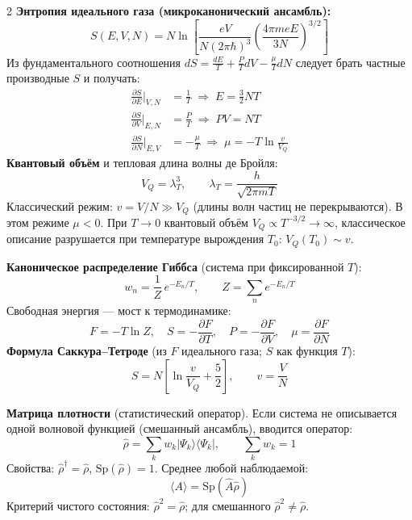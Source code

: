 \documentclass[a4paper,10pt]{article}
\begin{document}
\begin{multicols}{2}
\textbf{Энтропия идеального газа (микроканонический ансамбль):}
\begin{equation*}
    S(E,V,N) = N\ln\!\left[\frac{eV}{N(2\pi\hbar)^3}\!\left(\frac{4\pi meE}{3N}\right)^{\!3/2}\right]
\end{equation*}
Из фундаментального соотношения $dS = \frac{dE}{T} + \frac{P}{T}dV - \frac{\mu}{T}dN$ следует брать частные производные $S$ и получать:
\begin{align*}
    \frac{\partial S}{\partial E}\bigg|_{V,N} &= \frac{1}{T} \;\Rightarrow\; E = \tfrac{3}{2}NT \\[2pt]
    \frac{\partial S}{\partial V}\bigg|_{E,N} &= \frac{P}{T} \;\Rightarrow\; PV = NT \\[2pt]
    \frac{\partial S}{\partial N}\bigg|_{E,V} &= -\frac{\mu}{T} \;\Rightarrow\; \mu = -T\ln\frac{v}{V_Q}
\end{align*}
\textbf{Квантовый объём} и тепловая длина волны де Бройля:
\begin{equation*}
    V_Q = \lambda_T^3, \qquad \lambda_T = \frac{h}{\sqrt{2\pi mT}}
\end{equation*}
Классический режим: $v = V/N \gg V_Q$ (длины волн частиц не перекрываются). В этом режиме $\mu < 0$. При $T \to 0$ квантовый объём $V_Q \propto T^{-3/2} \to \infty$, классическое описание разрушается при температуре вырождения $T_0$: $V_Q(T_0) \sim v$.

\textbf{Каноническое распределение Гиббса} (система при фиксированной $T$):
\begin{equation*}
    w_n = \frac{1}{Z}\,e^{-E_n/T}, \qquad Z = \sum_n e^{-E_n/T}
\end{equation*}
Свободная энергия --- мост к термодинамике:
\begin{equation*}
    F = -T\ln Z, \quad S = -\frac{\partial F}{\partial T},\quad P = -\frac{\partial F}{\partial V},\quad \mu = \frac{\partial F}{\partial N}
\end{equation*}
\textbf{Формула Саккура--Тетроде} (из $F$ идеального газа; $S$ как функция $T$):
\begin{equation*}
    S = N\!\left[\ln\frac{v}{V_Q} + \frac{5}{2}\right], \qquad v = \frac{V}{N}
\end{equation*}

\textbf{Матрица плотности} (статистический оператор). Если система не описывается одной волновой функцией (смешанный ансамбль), вводится оператор:
\begin{equation*}
    \hat{\rho} = \sum_k w_k |\Psi_k\rangle\langle\Psi_k|, \qquad \sum_k w_k = 1
\end{equation*}
Свойства: $\hat{\rho}^\dagger = \hat{\rho}$, $\mathrm{Sp}(\hat{\rho}) = 1$. Среднее любой наблюдаемой:
\begin{equation*}
    \langle A \rangle = \mathrm{Sp}(\hat{A}\hat{\rho})
\end{equation*}
Критерий чистого состояния: $\hat{\rho}^2 = \hat{\rho}$; для смешанного $\hat{\rho}^2 \neq \hat{\rho}$.


\end{multicols}
\end{document}
